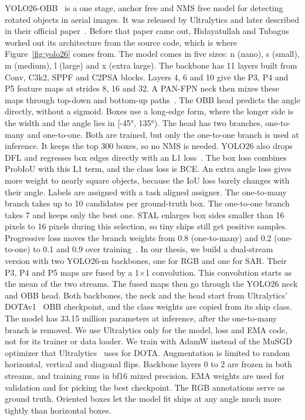 YOLO26-OBB~\cite{jocher2026ultralytics} is a one stage, anchor free and NMS free model for detecting rotated objects in aerial images. It was released by Ultralytics and later described in their official paper~\cite{jocher2026ultralytics}. Before that paper came out, Hidayatullah and Tubagus~\cite{Hidayatullah2026YOLO26AC} worked out its architecture from the source code, which is where Figure~\ref{fig:yolo26} comes from. The model comes in five sizes: n (nano), s (small), m (medium), l (large) and x (extra large). The backbone has 11 layers built from Conv, C3k2, SPPF and C2PSA blocks. Layers 4, 6 and 10 give the P3, P4 and P5 feature maps at strides 8, 16 and 32. A PAN-FPN neck then mixes these maps through top-down and bottom-up paths~\cite{Hidayatullah2026YOLO26AC}. The OBB head predicts the angle directly, without a sigmoid. Boxes use a long-edge form, where the longer side is the width and the angle lies in [-45°, 135°). The head has two branches, one-to-many and one-to-one. Both are trained, but only the one-to-one branch is used at inference. It keeps the top 300 boxes, so no NMS is needed. YOLO26 also drops DFL and regresses box edges directly with an L1 loss~\cite{jocher2026ultralytics}. The box loss combines ProbIoU with this L1 term, and the class loss is BCE. An extra angle loss gives more weight to nearly square objects, because the IoU loss barely changes with their angle. Labels are assigned with a task aligned assigner. The one-to-many branch takes up to 10 candidates per ground-truth box. The one-to-one branch takes 7 and keeps only the best one. STAL enlarges box sides smaller than 16 pixels to 16 pixels during this selection, so tiny ships still get positive samples. Progressive loss moves the branch weights from 0.8 (one-to-many) and 0.2 (one-to-one) to 0.1 and 0.9 over training~\cite{jocher2026ultralytics}. In our thesis, we build a dual-stream version with two YOLO26-m backbones, one for RGB and one for SAR. Their P3, P4 and P5 maps are fused by a 1×1 convolution. This convolution starts as the mean of the two streams. The fused maps then go through the YOLO26 neck and OBB head. Both backbones, the neck and the head start from Ultralytics' DOTAv1~\cite{xia2018dota} OBB checkpoint, and the class weights are copied from its ship class. The model has 33.15 million parameters at inference, after the one-to-many branch is removed. We use Ultralytics only for the model, loss and EMA code, not for its trainer or data loader. We train with AdamW instead of the MuSGD optimizer that Ultralytics~\cite{jocher2026ultralytics} uses for DOTA. Augmentation is limited to random horizontal, vertical and diagonal flips. Backbone layers 0 to 2 are frozen in both streams, and training runs in bf16 mixed precision. EMA weights are used for validation and for picking the best checkpoint. The RGB annotations serve as ground truth. Oriented boxes let the model fit ships at any angle much more tightly than horizontal boxes.\\

